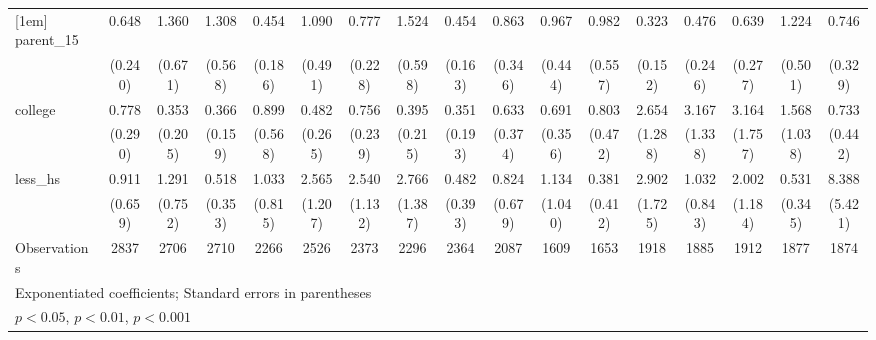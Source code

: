 {\begin{tabular}{l*{16}{c}}
[1em]
parent\_15           &       0.648         &       1.360         &       1.308         &       0.454         &       1.090         &       0.777         &       1.524         &       0.454\sym{*}  &       0.863         &       0.967         &       0.982         &       0.323\sym{*}  &       0.476         &       0.639         &       1.224         &       0.746         \\
                    &     (0.240)         &     (0.671)         &     (0.568)         &     (0.186)         &     (0.491)         &     (0.228)         &     (0.598)         &     (0.163)         &     (0.346)         &     (0.444)         &     (0.557)         &     (0.152)         &     (0.246)         &     (0.277)         &     (0.501)         &     (0.329)         \\
[1em]
college             &       0.778         &       0.353         &       0.366\sym{*}  &       0.899         &       0.482         &       0.756         &       0.395         &       0.351         &       0.633         &       0.691         &       0.803         &       2.654\sym{*}  &       3.167\sym{**} &       3.164\sym{*}  &       1.568         &       0.733         \\
                    &     (0.290)         &     (0.205)         &     (0.159)         &     (0.568)         &     (0.265)         &     (0.239)         &     (0.215)         &     (0.193)         &     (0.374)         &     (0.356)         &     (0.472)         &     (1.288)         &     (1.338)         &     (1.757)         &     (1.038)         &     (0.442)         \\
[1em]
less\_hs             &       0.911         &       1.291         &       0.518         &       1.033         &       2.565\sym{*}  &       2.540\sym{*}  &       2.766\sym{*}  &       0.482         &       0.824         &       1.134         &       0.381         &       2.902         &       1.032         &       2.002         &       0.531         &       8.388\sym{**} \\
                    &     (0.659)         &     (0.752)         &     (0.353)         &     (0.815)         &     (1.207)         &     (1.132)         &     (1.387)         &     (0.393)         &     (0.679)         &     (1.040)         &     (0.412)         &     (1.725)         &     (0.843)         &     (1.184)         &     (0.345)         &     (5.421)         \\
\hline
Observations        &        2837         &        2706         &        2710         &        2266         &        2526         &        2373         &        2296         &        2364         &        2087         &        1609         &        1653         &        1918         &        1885         &        1912         &        1877         &        1874         \\
\hline\hline
\multicolumn{17}{l}{\footnotesize Exponentiated coefficients; Standard errors in parentheses}\\
\multicolumn{17}{l}{\footnotesize \sym{*} \(p<0.05\), \sym{**} \(p<0.01\), \sym{***} \(p<0.001\)}\\
\end{tabular}
}
